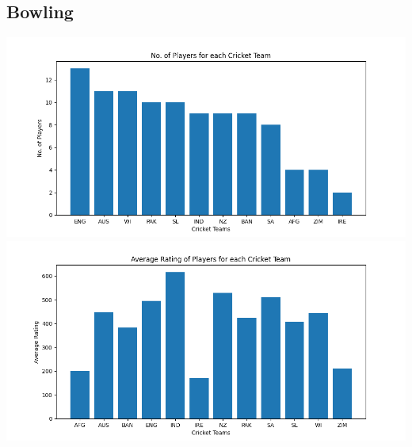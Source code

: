 \documentclass{article}
\begin{document}
\begin{normalsize}
            \subsection{Bowling}\label{subsec:bowling3}
                \includegraphics[scale=0.7]{test_bowling-1}
                \vspace{1em}\\
                \includegraphics[scale=0.7]{test_bowling-2}

\end{normalsize}
\end{document}
